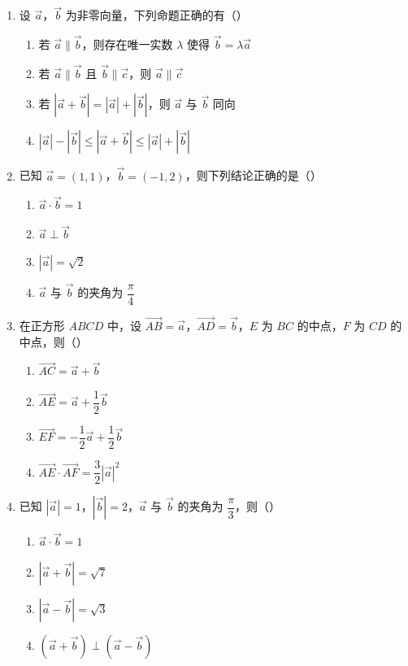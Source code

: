 \documentclass[12pt, a4paper]{ctexart}
\begin{document}
\begin{enumerate}[resume]
\item 设 $\vec{a}$，$\vec{b}$ 为非零向量，下列命题正确的有（\quad）
  \begin{enumerate}[label=\Alph*., itemsep=0pt]
    \item 若 $\vec{a}\parallel\vec{b}$，则存在唯一实数 $\lambda$ 使得 $\vec{b}=\lambda\vec{a}$
    \item 若 $\vec{a}\parallel\vec{b}$ 且 $\vec{b}\parallel\vec{c}$，则 $\vec{a}\parallel\vec{c}$
    \item 若 $|\vec{a}+\vec{b}|=|\vec{a}|+|\vec{b}|$，则 $\vec{a}$ 与 $\vec{b}$ 同向
    \item $|\vec{a}|-|\vec{b}|\leqslant|\vec{a}+\vec{b}|\leqslant|\vec{a}|+|\vec{b}|$
  \end{enumerate}

\item 已知 $\vec{a}=(1,1)$，$\vec{b}=(-1,2)$，则下列结论正确的是（\quad）
  \begin{enumerate}[label=\Alph*., itemsep=0pt]
    \item $\vec{a}\cdot\vec{b}=1$
    \item $\vec{a}\perp\vec{b}$
    \item $|\vec{a}|=\sqrt{2}$
    \item $\vec{a}$ 与 $\vec{b}$ 的夹角为 $\dfrac{\pi}{4}$
  \end{enumerate}

\item 在正方形 $ABCD$ 中，设 $\overrightarrow{AB}=\vec{a}$，$\overrightarrow{AD}=\vec{b}$，$E$ 为 $BC$ 的中点，$F$ 为 $CD$ 的中点，则（\quad）
  \begin{enumerate}[label=\Alph*., itemsep=0pt]
    \item $\overrightarrow{AC}=\vec{a}+\vec{b}$
    \item $\overrightarrow{AE}=\vec{a}+\dfrac{1}{2}\vec{b}$
    \item $\overrightarrow{EF}=-\dfrac{1}{2}\vec{a}+\dfrac{1}{2}\vec{b}$
    \item $\overrightarrow{AE}\cdot\overrightarrow{AF}=\dfrac{3}{2}|\vec{a}|^2$
  \end{enumerate}

\item 已知 $|\vec{a}|=1$，$|\vec{b}|=2$，$\vec{a}$ 与 $\vec{b}$ 的夹角为 $\dfrac{\pi}{3}$，则（\quad）
  \begin{enumerate}[label=\Alph*., itemsep=0pt]
    \item $\vec{a}\cdot\vec{b}=1$
    \item $|\vec{a}+\vec{b}|=\sqrt{7}$
    \item $|\vec{a}-\vec{b}|=\sqrt{3}$
    \item $(\vec{a}+\vec{b})\perp(\vec{a}-\vec{b})$
  \end{enumerate}
\end{enumerate}
\end{document}
